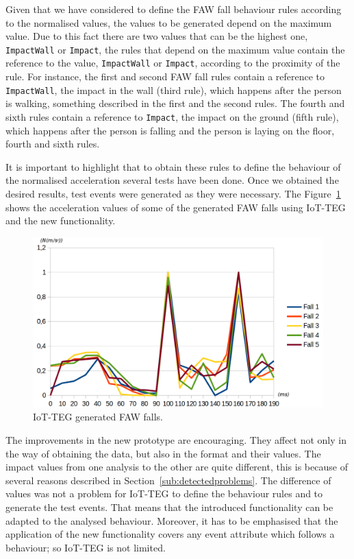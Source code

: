 \documentclass[journal]{IEEEtran}
\begin{document}
Given that we have considered to define the FAW fall behaviour
rules according to the normalised values, the values to be generated depend on the maximum value. Due to this fact there are two values that can be the highest one, \texttt{\small{ImpactWall}} or \texttt{\small{Impact}}, the rules that depend on the maximum 
value contain the reference to the value, \texttt{\small{ImpactWall}} or \texttt{\small{Impact}}, according to the proximity
of the rule. For instance, the first and second FAW fall rules contain a reference to \texttt{\small{ImpactWall}}, the impact 
in the wall (third rule), which happens after the person is walking, something described in the first and the second rules.
The fourth and sixth rules contain a reference to \texttt{\small{Impact}}, the impact on the ground (fifth rule), which happens
after the person is falling and the person is laying on the floor, fourth and sixth rules.

It is important to highlight that to obtain these rules to define the behaviour of the normalised acceleration several tests
have been done. Once we obtained the desired results, test events were generated as they were necessary. The 
Figure~\ref{fig:IoTTEGFAWGeneratedEvents} shows the acceleration values of some of the generated FAW falls using
IoT-TEG and the new functionality.

\begin{figure}[!ht]
  \centering
  \includegraphics[scale=0.2]{img/IoTTEGFAWGeneratedEvents}
  \caption[IoT-TEG generated FAW falls]{IoT-TEG generated FAW falls.}
  \label{fig:IoTTEGFAWGeneratedEvents}
\end{figure}

The improvements in the new prototype are encouraging. They affect not only in the way of obtaining the data, but 
also in the format and their values. The impact values from one analysis to the other are quite different, 
this is because of several reasons described in Section~\ref{sub:detectedproblems}. The difference
of values was not a problem for IoT-TEG to define the behaviour rules and to generate the test events. That
means that the introduced functionality can be adapted to the analysed
behaviour. Moreover, it has to be emphasised that the application of the new functionality covers any event attribute which follows a behaviour;
so IoT-TEG is not limited.
\end{document}
